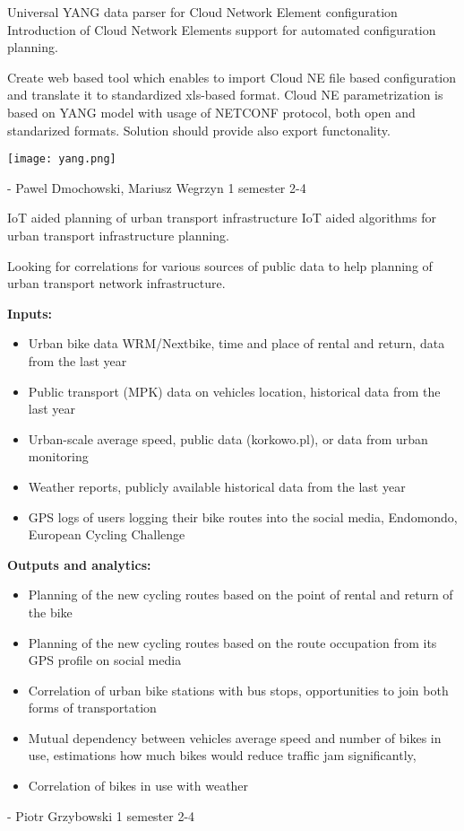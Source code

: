 \begin{project}
{Universal YANG data parser for Cloud Network Element configuration}
{Introduction of Cloud Network Elements support for automated configuration planning.} 
{ 
Create web based tool which enables to import Cloud NE file based configuration and translate it to standardized xls-based format. Cloud NE parametrization is based on YANG model with usage of NETCONF protocol, both open and standarized formats. Solution should provide also export functonality.
\begin{center}\texttt{[image: yang.png]}\end{center}
}
{-}
{Pawel Dmochowski, Mariusz Wegrzyn}
{1 semester}
{2-4}
\end{project}
\begin{project}
{IoT aided planning of urban transport infrastructure}
{IoT aided algorithms for urban transport infrastructure planning.} 
{ 
Looking for correlations for various sources of public data to help planning of urban transport network infrastructure.

\textbf{Inputs:}
\begin{itemize}
	\item Urban bike data WRM/Nextbike, time and place of rental and return, data from the last year
	\item Public transport (MPK) data on vehicles location, historical data from the last year
	\item Urban-scale average speed, public data (korkowo.pl), or data from urban monitoring
	\item Weather reports, publicly available historical data from the last year
	\item GPS logs of users logging their bike routes into the social media, Endomondo, European Cycling Challenge
\end{itemize} 
\textbf{Outputs and analytics:}
\begin{itemize}
	\item Planning of the new cycling routes based on the point of rental and return of the bike
	\item Planning of the new cycling routes based on the route occupation from its  GPS profile on social media
	\item Correlation of urban bike stations with bus stops, opportunities to join both forms of transportation
	\item Mutual dependency between vehicles average speed and number of bikes in use, estimations how much bikes would reduce traffic jam significantly,
	\item Correlation of bikes in use with weather 
\end{itemize} 
}
{-}
{Piotr Grzybowski}
{1 semester}
{2-4}
\end{project}

